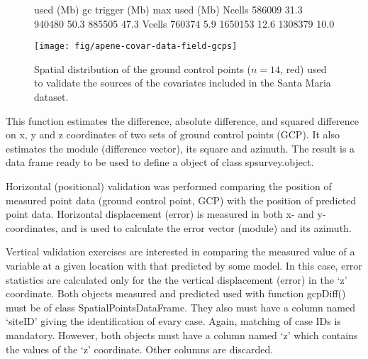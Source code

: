 \begin{figure}[!ht]
 \centering
\begin{Schunk}
\begin{Soutput}
         used (Mb) gc trigger (Mb) max used (Mb)
Ncells 586009 31.3     940480 50.3   885505 47.3
Vcells 760374  5.9    1650153 12.6  1308379 10.0
\end{Soutput}
\end{Schunk}
\texttt{[image: fig/apene-covar-data-field-gcps]}
\caption{Spatial distribution of the ground control points ($n = 14$, red) used to validate the sources of the
covariates included in the Santa Maria dataset.}
\label{fig:covar-data-field-gcps}
\end{figure}





This function estimates the difference, absolute difference, and squared difference on x, y and z coordinates 
of two sets of ground control points (GCP). It also estimates the module (difference vector), its square and 
azimuth. The result is a data frame ready to be used to define a object of class spsurvey.object.

Horizontal (positional) validation was performed comparing the position of measured point data (ground control 
point, GCP) with the position of predicted point data. Horizontal displacement (error) is measured in both x- 
and y-coordinates, and is used to calculate the error vector (module) and its azimuth.

Vertical validation exercises are interested in comparing the measured value of a variable at a given location 
with that predicted by some model. In this case, error statistics are calculated only for the the vertical 
displacement (error) in the ‘z’ coordinate. Both objects measured and predicted used with function gcpDiff() 
must be of class SpatialPointsDataFrame. They also must have a column named ‘siteID’ giving the identification 
of evary case. Again, matching of case IDs is mandatory. However, both objects must have a column named ‘z’ 
which contains the values of the ‘z’ coordinate. Other columns are discarded.


